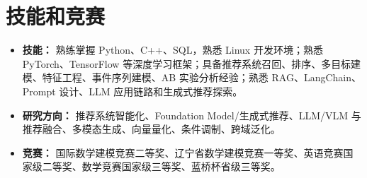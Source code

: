 \documentclass[fontset=none,a4paper,10pt]{ctexart}
\begin{document}
\section{技能和竞赛}
\begin{itemize}[leftmargin=*, itemsep=3pt, topsep=-1pt]
\item \textbf{技能：} 熟练掌握 Python、C++、SQL，熟悉 Linux 开发环境；熟悉 PyTorch、TensorFlow 等深度学习框架；具备推荐系统召回、排序、多目标建模、特征工程、事件序列建模、AB 实验分析经验；熟悉 RAG、LangChain、Prompt 设计、LLM 应用链路和生成式推荐探索。
\item \textbf{研究方向：} 推荐系统智能化、Foundation Model/生成式推荐、LLM/VLM 与推荐融合、多模态生成、向量量化、条件调制、跨域泛化。
\item \textbf{竞赛：} 国际数学建模竞赛二等奖、辽宁省数学建模竞赛一等奖、英语竞赛国家级二等奖、数学竞赛国家级三等奖、蓝桥杯省级三等奖。
\end{itemize}
\end{document}
